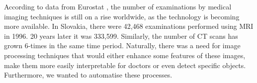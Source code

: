 According to data from Eurostat \cite{eurostat2019}, the number of examinations by medical imaging techniques is still on a rise worldwide, as the technology is becoming more available. In Slovakia, there were 42,468 examinations performed using MRI in 1996. 20 years later it was 333,599. Similarly, the number of CT scans has grown 6-times in the same time period. Naturally, there was a need for image processing techniques that would either enhance some features of these images, make them more easily interpretable for doctors or even detect specific objects. Furthermore, we wanted to automatise these processes. 




 


